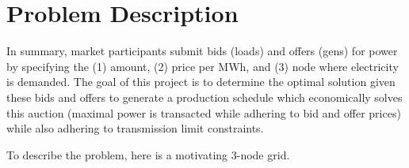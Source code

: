 \documentclass[11pt]{article}
\begin{document}
\newpage
\tableofcontents
\newpage

\section{Problem Description}

In summary, market participants submit bids (loads) and offers (gens) for power by specifying the (1) amount, (2) price per MWh, and (3) node where electricity is demanded. The goal of this project is to determine the optimal solution given these bids and offers to generate a production schedule which economically solves this auction (maximal power is transacted while adhering to bid and offer prices) while also adhering to transmission limit constraints. 

To describe the problem, here is a motivating 3-node grid.
\end{document}
